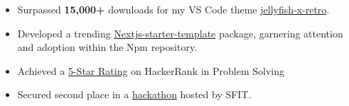 \smallskip
\begin{itemize} 

\item Surpassed \textbf{15,000+} downloads for my VS Code theme \href{https://marketplace.visualstudio.com/items?itemName=Bhanu1776.jellyfish-retro}{jellyfish-x-retro}.
\smallskip
\item Developed a trending \href{https://starter-website-sigma.vercel.app/}{Nextjs-starter-template} package, garnering attention and adoption within the Npm repository.
\smallskip
\item Achieved a \href{https://www.linkedin.com/posts/bhanu1776_achievementunlocked-gratitude-hackerrank-activity-7178401061966147584-jYYN?utm_source=share&utm_medium=member_desktop}{5-Star Rating} on HackerRank in Problem Solving
\smallskip
\item Secured second place in a \href{https://drive.google.com/file/d/1nK1eTLe6yCUdPNcGmBzwhcu8pcJDxh5a/view?usp=sharing}{hackathon} hosted by SFIT.\\
\end{itemize}
